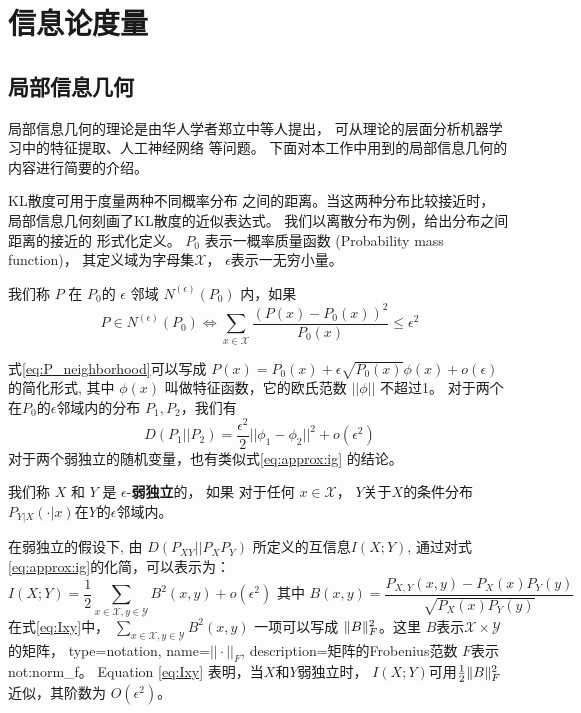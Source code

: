 \section{信息论度量}
\subsection{局部信息几何}\label{sec:local_geometry}
局部信息几何的理论是由华人学者郑立中等人提出\cite{huang2019universal}，
可从理论的层面分析机器学习中的特征提取\cite{huang2017information}、人工神经网络
\cite{huang2019information}等问题。
下面对本工作中用到的局部信息几何的内容进行简要的介绍。

KL散度可用于度量两种不同概率分布
之间的距离。当这两种分布比较接近时，
局部信息几何刻画了KL散度的近似表达式。
我们以离散分布为例，给出分布之间距离的接近的
形式化定义。
$P_0$ 表示一概率质量函数 (Probability mass function)，
其定义域为字母集$\mathcal{X}$，
$\epsilon$表示一无穷小量。
\begin{definition}\label{def:eps_neighborhood}
我们称 $P$ 在 $P_0$的 $\epsilon$ 邻域 $N^{(\epsilon)}(P_0)$ 内，如果
\begin{equation}\label{eq:P_neighborhood}
P \in N^{(\epsilon)}(P_0) \iff
\sum_{x \in \mathcal{X}} \frac{(P(x) - P_0(x))^2}{P_0(x)} \leq \epsilon^2
\end{equation}
\end{definition}
式\eqref{eq:P_neighborhood}可以写成 $P(x) = P_0(x) + \epsilon
\sqrt{P_0(x)} \phi(x) + o(\epsilon)$的简化形式, 其中 $\phi(x)$
叫做特征函数，它的欧氏范数 $||\phi || $ 不超过1。
对于两个在$P_0$的$\epsilon$邻域内的分布 $P_1, P_2$，我们有
\begin{equation}\label{eq:approx:ig}
D(P_1 || P_2) = \frac{\epsilon^2}{2} ||\phi_1 - \phi_2||^2 + o(\epsilon^2)
\end{equation}
对于两个弱独立的随机变量，也有类似式\ref{eq:approx:ig}
的结论。
\begin{definition}\label{def:weak_indepedent}
我们称 $X$ 和 $Y$ 是 $\epsilon$-\textbf{弱独立}的，
如果 对于任何 $x \in \mathcal{X}$，
$Y$关于$X$的条件分布
$P_{Y|X}(\cdot |x)$在$Y$的$\epsilon$邻域内。
\end{definition}
在弱独立的假设下, 由 $D(P_{XY}||P_XP_Y)$ 所定义的互信息$I(X;Y)$, 
通过对式\eqref{eq:approx:ig}的化简，可以表示为：
\begin{equation}\label{eq:Ixy}
I(X;Y) = \frac{1}{2}\sum_{x\in \mathcal{X}, y\in \mathcal{Y}} B^2(x,y) + o(\epsilon^2)
\textrm{ 其中 }  B(x,y)=\frac{P_{X,Y}(x,y) - P_X(x) P_Y(y)}{\sqrt{P_X(x)P_Y(y)}}
\end{equation}
在式\eqref{eq:Ixy}中， $\sum_{x\in \mathcal{X}, y\in \mathcal{Y}} B^2(x,y)$
一项可以写成 $\lVert B\rVert_F^2$。这里 $B$表示$\mathcal{X} \times \mathcal{Y}$的矩阵，
{
  type=notation,
  name={$||\cdot||_F$},
  description={矩阵的Frobenius范数}
}
$F$表示 \glsdesc{not:norm_f}。
Equation \eqref{eq:Ixy} 表明，当$X$和$Y$弱独立时，
$I(X;Y)$可用$\frac{1}{2} \lVert B\rVert_F^2$
近似，其阶数为 $O(\epsilon^2)$。

